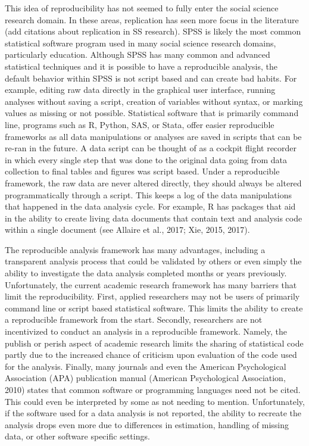 \documentclass[english,,man]{apa6}
\begin{document}
This idea of reproducibility has not seemed to fully enter the social science research domain. In these areas, replication has seen more focus in the literature (add citations about replication in SS research). SPSS is likely the most common statistical software program used in many social science research domains, particularly education. Although SPSS has many common and advanced statistical techniques and it is possible to have a reproducible analysis, the default behavior within SPSS is not script based and can create bad habits. For example, editing raw data directly in the graphical user interface, running analyses without saving a script, creation of variables without syntax, or marking values as missing or not possible. Statistical software that is primarily command line, programs such as R, Python, SAS, or Stata, offer easier reproducible frameworks as all data manipulations or analyses are saved in scripts that can be re-ran in the future. A data script can be thought of as a cockpit flight recorder in which every single step that was done to the original data going from data collection to final tables and figures was script based. Under a reproducible framework, the raw data are never altered directly, they should always be altered programmatically through a script. This keeps a log of the data manipulations that happened in the data analysis cycle. For example, R has packages that aid in the ability to create living data documents that contain text and analysis code within a single document (see Allaire et al., 2017; Xie, 2015, 2017).

The reproducible analysis framework has many advantages, including a transparent analysis process that could be validated by others or even simply the ability to investigate the data analysis completed months or years previously. Unfortunately, the current academic research framework has many barriers that limit the reproducibility. First, applied researchers may not be users of primarily command line or script based statistical software. This limits the ability to create a reproducible framework from the start. Secondly, researchers are not incentivized to conduct an analysis in a reproducible framework. Namely, the publish or perish aspect of academic research limits the sharing of statistical code partly due to the increased chance of criticism upon evaluation of the code used for the analysis. Finally, many journals and even the American Psychological Association (APA) publication manual (American Psychological Association, 2010) states that common software or programming languages need not be cited. This could even be interpreted by some as not needing to mention. Unfortunately, if the software used for a data analysis is not reported, the ability to recreate the analysis drops even more due to differences in estimation, handling of missing data, or other software specific settings.
\end{document}

